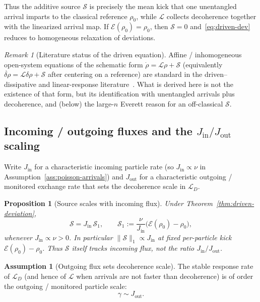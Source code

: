 \documentclass[11pt]{article}
\newtheorem{proposition}[theorem]{Proposition}
\theoremstyle{definition}
\newtheorem{assumption}[theorem]{Assumption}
\theoremstyle{remark}
\newtheorem{remark}[theorem]{Remark}
\begin{document}
Thus the additive source $\mathcal S$ is precisely the mean kick that one unentangled arrival imparts to the classical reference $\rho_0$, while $\mathcal L$ collects decoherence together with the linearized arrival map.
If $\mathcal E(\rho_0)=\rho_0$, then $\mathcal S=0$ and~\eqref{eq:driven-dev} reduces to homogeneous relaxation of deviations.

\begin{remark}[Literature status of the driven equation]
\label{rem:lit-driven}
Affine / inhomogeneous open-system equations of the schematic form $\dot\rho=\mathcal L\rho+\mathcal S$ (equivalently $\dot{\delta\rho}=\mathcal L\delta\rho+\mathcal S$ after centering on a reference) are standard in the driven--dissipative and linear-response literature~\cite{breuerPetruccione2002,gardinerZoller2004}.
What is derived here is not the existence of that form, but its identification with unentangled arrivals plus decoherence, and (below) the large-$n$ Everett reason for an off-classical $\mathcal S$.
\end{remark}

\subsection{Incoming / outgoing fluxes and the $J_{\mathrm{in}}/J_{\mathrm{out}}$ scaling}
\label{sec:jin-jout}
Write $J_{\mathrm{in}}$ for a characteristic incoming particle rate (so $J_{\mathrm{in}}\propto\nu$ in Assumption~\ref{ass:poisson-arrivals}) and $J_{\mathrm{out}}$ for a characteristic outgoing / monitored exchange rate that sets the decoherence scale in $\mathcal L_D$.

\begin{proposition}[Source scales with incoming flux]
\label{prop:S-Jin}
Under Theorem~\ref{thm:driven-deviation},
\begin{equation}
  \mathcal S=J_{\mathrm{in}}\,\mathcal S_1,
  \qquad
  \mathcal S_1:=\frac{\nu}{J_{\mathrm{in}}}\bigl(\mathcal E(\rho_0)-\rho_0\bigr),
\end{equation}
whenever $J_{\mathrm{in}}\propto\nu>0$.
In particular $\|\mathcal S\|_1\propto J_{\mathrm{in}}$ at fixed per-particle kick $\mathcal E(\rho_0)-\rho_0$.
Thus $\mathcal S$ itself tracks \emph{incoming} flux, not the ratio $J_{\mathrm{in}}/J_{\mathrm{out}}$.
\end{proposition}

\begin{assumption}[Outgoing flux sets decoherence scale]
\label{ass:Jout-decoherence}
The stable response rate of $\mathcal L_D$ (and hence of $\mathcal L$ when arrivals are not faster than decoherence) is of order the outgoing / monitored particle scale:
\begin{equation}
  \gamma\sim J_{\mathrm{out}}.
\end{equation}
\end{assumption}
\end{document}
